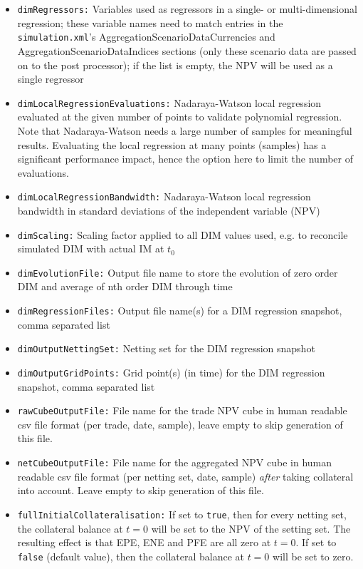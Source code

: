 {\begin{itemize}
\item {\tt dimRegressors:} Variables used as regressors in a single- or multi-dimensional regression; these variable
  names need to match entries in the {\tt simulation.xml}'s AggregationScenarioDataCurrencies and
  AggregationScenarioDataIndices sections (only these scenario data are passed on to the post processor); if the list is
  empty, the NPV will be used as a single regressor
\item {\tt dimLocalRegressionEvaluations:} Nadaraya-Watson local regression evaluated at the given number of points to
validate polynomial regression. Note that Nadaraya-Watson needs a large number of samples for meaningful
results. Evaluating the local regression at many points (samples) has a significant performance impact, hence the option
here to limit the number of evaluations.
\item {\tt dimLocalRegressionBandwidth:} Nadaraya-Watson local regression bandwidth in standard deviations of the
independent variable (NPV)
\item {\tt dimScaling:} Scaling factor applied to all DIM values used, e.g. to reconcile simulated DIM with actual IM at
$t_0$
\item {\tt dimEvolutionFile:} Output file name to store the evolution of zero order DIM and average of nth order DIM
through time
\item {\tt dimRegressionFiles:} Output file name(s) for a DIM regression snapshot, comma separated list
\item {\tt dimOutputNettingSet:} Netting set for the DIM regression snapshot
\item {\tt dimOutputGridPoints:} Grid point(s) (in time) for the DIM regression snapshot, comma separated list
\item {\tt rawCubeOutputFile:} File name for the trade NPV cube in human readable csv file format (per trade, date,
sample), leave empty to skip generation of this file.
\item {\tt netCubeOutputFile:} File name for the aggregated NPV cube in human readable csv file format (per netting set,
date, sample) {\em after} taking collateral into account. Leave empty to skip generation of this file.
\item {\tt fullInitialCollateralisation:} If set to {\tt true}, then for every netting set, the collateral balance at $t=0$ will be set to the NPV of the setting set. The resulting effect is that EPE, ENE and PFE are all zero at $t=0$. If set to {\tt false} (default value), then the collateral balance at $t=0$ will be set to zero.

\end{itemize}}
